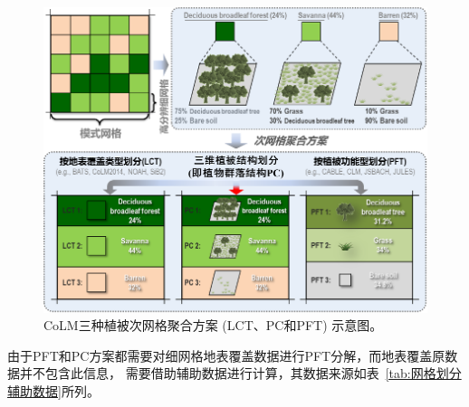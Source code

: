 {
\begin{figure}[]
\centering
\includegraphics{Figures/地表输入数据/次网格聚合方案.png}
\caption{CoLM三种植被次网格聚合方案 (LCT、PC和PFT) 示意图。}
\label{fig:次网格聚合方案}
\end{figure}
}


由于PFT和PC方案都需要对细网格地表覆盖数据进行PFT分解，而地表覆盖原数据并不包含此信息，
需要借助辅助数据进行计算，其数据来源如表~\ref{tab:网格划分辅助数据}所列。


